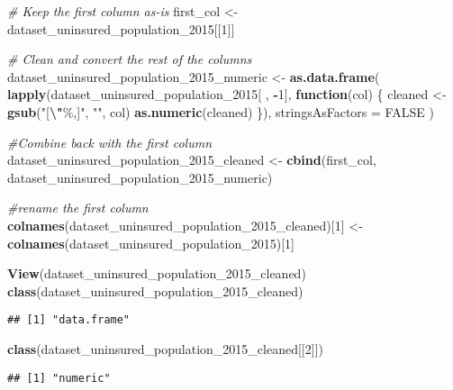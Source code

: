 \documentclass[
]{article}
\newenvironment{Shaded}{\begin{snugshade}}{\end{snugshade}}
\newcommand{\AttributeTok}[1]{\textcolor[rgb]{0.13,0.29,0.53}{#1}}
\newcommand{\CommentTok}[1]{\textcolor[rgb]{0.56,0.35,0.01}{\textit{#1}}}
\newcommand{\ConstantTok}[1]{\textcolor[rgb]{0.56,0.35,0.01}{#1}}
\newcommand{\ControlFlowTok}[1]{\textcolor[rgb]{0.13,0.29,0.53}{\textbf{#1}}}
\newcommand{\DecValTok}[1]{\textcolor[rgb]{0.00,0.00,0.81}{#1}}
\newcommand{\FunctionTok}[1]{\textcolor[rgb]{0.13,0.29,0.53}{\textbf{#1}}}
\newcommand{\NormalTok}[1]{#1}
\newcommand{\OtherTok}[1]{\textcolor[rgb]{0.56,0.35,0.01}{#1}}
\newcommand{\SpecialCharTok}[1]{\textcolor[rgb]{0.81,0.36,0.00}{\textbf{#1}}}
\newcommand{\StringTok}[1]{\textcolor[rgb]{0.31,0.60,0.02}{#1}}
\begin{document}
\begin{Shaded}
\begin{Highlighting}[]
\CommentTok{\# Keep the first column as{-}is}
\NormalTok{first\_col }\OtherTok{\textless{}{-}}\NormalTok{ dataset\_uninsured\_population\_2015[[}\DecValTok{1}\NormalTok{]]}

\CommentTok{\# Clean and convert the rest of the columns}
\NormalTok{dataset\_uninsured\_population\_2015\_numeric }\OtherTok{\textless{}{-}} \FunctionTok{as.data.frame}\NormalTok{(}
  \FunctionTok{lapply}\NormalTok{(dataset\_uninsured\_population\_2015[ , }\SpecialCharTok{{-}}\DecValTok{1}\NormalTok{], }\ControlFlowTok{function}\NormalTok{(col) \{}
\NormalTok{    cleaned }\OtherTok{\textless{}{-}} \FunctionTok{gsub}\NormalTok{(}\StringTok{"[}\SpecialCharTok{\textbackslash{}"}\StringTok{\%,]"}\NormalTok{, }\StringTok{""}\NormalTok{, col)}
    \FunctionTok{as.numeric}\NormalTok{(cleaned)}
\NormalTok{  \}),}
  \AttributeTok{stringsAsFactors =} \ConstantTok{FALSE}
\NormalTok{)}

\CommentTok{\#Combine back with the first column}
\NormalTok{dataset\_uninsured\_population\_2015\_cleaned }\OtherTok{\textless{}{-}} \FunctionTok{cbind}\NormalTok{(first\_col, dataset\_uninsured\_population\_2015\_numeric)}

\CommentTok{\#rename the first column}
\FunctionTok{colnames}\NormalTok{(dataset\_uninsured\_population\_2015\_cleaned)[}\DecValTok{1}\NormalTok{] }\OtherTok{\textless{}{-}} \FunctionTok{colnames}\NormalTok{(dataset\_uninsured\_population\_2015)[}\DecValTok{1}\NormalTok{]}

\FunctionTok{View}\NormalTok{(dataset\_uninsured\_population\_2015\_cleaned)}
\FunctionTok{class}\NormalTok{(dataset\_uninsured\_population\_2015\_cleaned)}
\end{Highlighting}
\end{Shaded}

\begin{verbatim}
## [1] "data.frame"
\end{verbatim}

\begin{Shaded}
\begin{Highlighting}[]
\FunctionTok{class}\NormalTok{(dataset\_uninsured\_population\_2015\_cleaned[[}\DecValTok{2}\NormalTok{]])}
\end{Highlighting}
\end{Shaded}

\begin{verbatim}
## [1] "numeric"
\end{verbatim}
\end{document}
